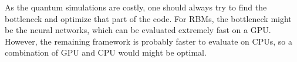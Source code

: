 As the quantum simulations are costly, one should always try to find the bottleneck and optimize that part of the code. For RBMs, the bottleneck might be the neural networks, which can be evaluated extremely fast on a GPU. However, the remaining framework is probably faster to evaluate on CPUs, so a combination of GPU and CPU would might be optimal.
